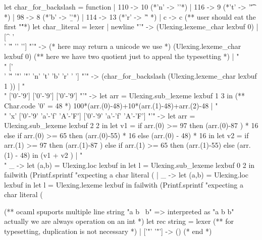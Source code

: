 \begin{enumerate}
\begin{enumerate}
\begin{bluecode}
let char_for_backslash = function 
  | 110 ->  10 (*'n' -> '\n'*)
  | 116 -> 9   (*'t' -> '\t' *)
  | 98  -> 8   (*'b' -> '\b'*)
  | 114 -> 13  (*'r' -> '\r' *)
  | c -> c 
(** user should eat the first "\'"*)
let char_literal = lexer 
  | newline "'" -> 
    (Ulexing.lexeme_char lexbuf 0) 
  |  [^ '\\' '\'' '' ''] "'" -> 
    (* here may return a unicode we use *)
    (Ulexing.lexeme_char lexbuf 0)
    (** here we have two quotient just to appeal the typesetting *)
  | "\\" ['\\' '\'' '"' '"' 'n' 't' 'b' 'r' ' '] "'" -> 
    (char_for_backslash (Ulexing.lexeme_char lexbuf 1 ))
  | "\\" ['0'-'9'] ['0'-'9'] ['0'-'9'] "'" -> 
    let arr = Ulexing.sub_lexeme lexbuf 1 3 in 
    (** Char.code '0' = 48 *)
    100*(arr.(0)-48)+10*(arr.(1)-48)+arr.(2)-48
  | "\\" 'x' ['0'-'9' 'a'-'f' 'A'-'F'] ['0'-'9' 'a'-'f' 'A'-'F'] "'" -> 
    let arr = Ulexing.sub_lexeme lexbuf 2 2 in 
    let v1 = 
      if arr.(0) >= 97 
      then (arr.(0)-87 ) * 16 
      else if arr.(0) >= 65 
      then (arr.(0)-55) * 16 
      else (arr.(0) - 48) * 16 in
    let v2 = 
      if arr.(1) >= 97 
      then (arr.(1)-87 ) 
      else if arr.(1) >= 65 
      then (arr.(1)-55) 
      else (arr.(1) - 48) in 
    (v1 + v2 )
  | "\\" _ -> 
    let (a,b) = Ulexing.loc lexbuf in 
    let l = Ulexing.sub_lexeme lexbuf 0 2  in
    failwith 
    (Printf.sprintf 
       "expecting a char literal (%
  | _ -> 
    let (a,b) = Ulexing.loc lexbuf in 
    let l = Ulexing.lexeme lexbuf in
    failwith 
    (Printf.sprintf 
       "expecting a char literal (%
       
(** ocaml spuports multiple line string "a b \ 
    b" => interpreted as "a b b"
    actually we are always operation on an int 
*)
let rec string = lexer
  (** for typesetting, duplication is not necessary *)
  | ['"' '"'] -> () (* end *)
   

\end{bluecode}
\end{enumerate}
\end{enumerate}

